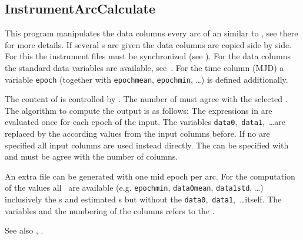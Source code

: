 \clearpage
\subsection{InstrumentArcCalculate}\label{InstrumentArcCalculate}
This program manipulates the data columns every arc of an  similar to
, see there for more details.
If several s are given the data columns are copied side by side.
For this the instrument files must be synchronized (see ). For the data
columns the standard data variables are available, see~.
For the time column (MJD) a variable \verb|epoch| (together with \verb|epochmean|, \verb|epochmin|, \ldots)
is defined additionally.

The content of  is controlled by .
The number of  must agree with the selected .
The algorithm to compute the output is as follows:
The expressions in  are evaluated once for each epoch of the input.
The variables \verb|data0|,~\verb|data1|,~\ldots are replaced by the according values from the input columns before.
If no  are specified all input columns are used instead directly.
The  can be specified with  and must be agree with the number of columns.

An extra  file can be generated with one mid epoch per arc. For the computation of the  values
all~ are available (e.g. \verb|epochmin|, \verb|data0mean|, \verb|data1std|, \ldots)
inclusively the s and estimated s but without the \verb|data0|,~\verb|data1|,~\ldots itself.
The variables and the numbering of the columns refers to the .

See also , .


